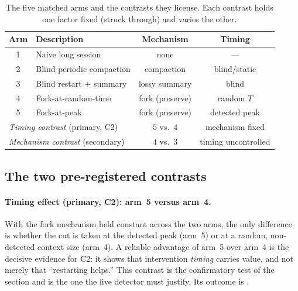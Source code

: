 \begin{table}[h]
  \centering
  \caption{The five matched arms and the contrasts they license. Each contrast
  holds one factor fixed (struck through) and varies the other.}
  \label{tab:arms}
  \begin{tabular}{c l c c}
    \toprule
    Arm & Description & Mechanism & Timing \\
    \midrule
    1 & Naive long session            & none              & ---            \\
    2 & Blind periodic compaction     & compaction        & blind/static   \\
    3 & Blind restart $+$ summary     & lossy summary     & blind          \\
    4 & Fork-at-random-time           & fork (preserve)   & random $T$     \\
    5 & Fork-at-peak                  & fork (preserve)   & detected peak  \\
    \midrule
    \multicolumn{2}{l}{\emph{Timing contrast} (primary, C2)}
        & \multicolumn{1}{c}{$5$ vs.\ $4$} & mechanism fixed \\
    \multicolumn{2}{l}{\emph{Mechanism contrast} (secondary)}
        & \multicolumn{1}{c}{$4$ vs.\ $3$} & timing uncontrolled \\
    \bottomrule
  \end{tabular}
\end{table}

\subsection{The two pre-registered contrasts}
\label{sec:intervention:contrasts}

\paragraph{Timing effect (primary, C2): arm~5 versus arm~4.}
With the fork mechanism held constant across the two arms, the only difference
is whether the cut is taken at the detected peak (arm~5) or at a random,
non-detected context size (arm~4). A reliable advantage of arm~5 over arm~4 is
the decisive evidence for C2: it shows that intervention \emph{timing} carries
value, and not merely that ``restarting helps.'' This contrast is the
confirmatory test of the section and is the one the live detector must justify.
Its outcome is .

